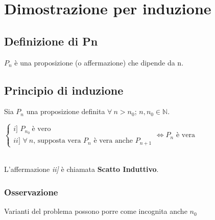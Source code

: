 \chapter{Dimostrazione per induzione}
\section{Definizione di Pn}
$P_n$ è una proposizione (o affermazione) che dipende da n.

\section{Principio di induzione}
Sia $P_n$ una proposizione definita $\forall\ n>n_0$;  $n,n_0 \in \mathbb{N}$.\\
\begin{Large}

$\begin{cases}
\textit{i] }P_{n_0}\ \text{è vero}\\
\textit{ii] }\forall\ n \text{, supposta vera } P_n \text{ è vera anche } P_{n+1}
\end{cases} \iff P_n \text{ è vera}$
\end{Large}\\
L'affermazione \textit{ii]} è chiamata \textbf{Scatto Induttivo}.

\subsection{Osservazione}
Varianti del problema possono porre come incognita anche $n_0$